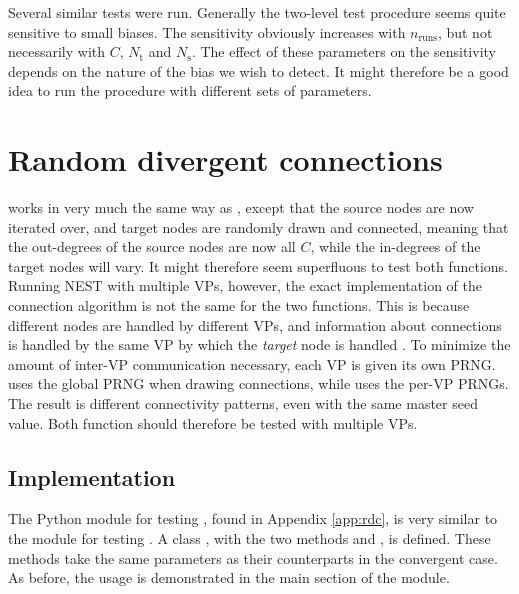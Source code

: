 Several similar tests were run. Generally the two-level test procedure seems quite sensitive to small biases. The sensitivity obviously increases with $n_\text{runs}$, but not necessarily with $C$, $N_\text{t}$ and $N_\text{s}$. The effect of these parameters on the sensitivity depends on the nature of the bias we wish to detect. It might therefore be a good idea to run the procedure with different  sets of parameters. 

\graphicspath{{figs/nonspatial/}}



\section{Random divergent connections\label{sec:rdc}}

 works in very much the same way as \linebreak {}, except that the source nodes are now iterated over, and target nodes are randomly drawn and connected, meaning that the out-degrees of the source nodes are now all $C$, while the in-degrees of the target nodes will vary. It might therefore seem superfluous to test both functions. Running NEST with multiple VPs, however, the exact implementation of the connection algorithm is not the same for the two functions. This is because different nodes are handled by different VPs, and information about connections is handled by the same VP by which the \emph{target} node is handled \cite{plesser2007efficient}. To minimize the amount of inter-VP communication necessary, each VP is given its own PRNG.  uses the global PRNG when drawing connections, while  uses the per-VP PRNGs. The result is different connectivity patterns, even with the same master seed value. Both function should therefore be tested with multiple VPs.



\subsection{Implementation\label{subsec:rdcimp}}

The Python module for testing , found in Appendix \ref{app:rdc}, is very similar to the module for testing . A class , with the two methods  and , is defined. These methods take the same parameters as their counterparts in the convergent case. As before, the usage is demonstrated in the main section of the module.



